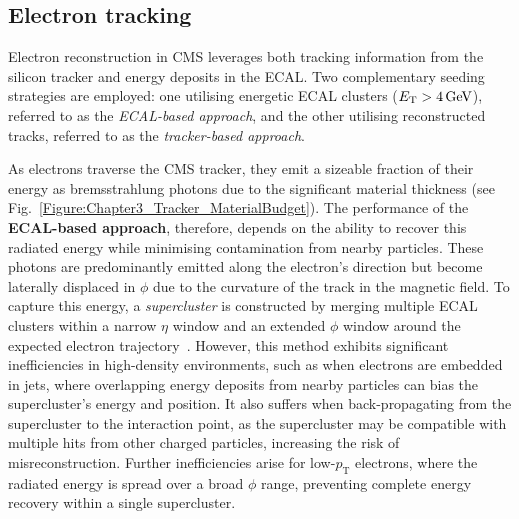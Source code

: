 \subsection{Electron tracking}
\label{Section:Chapter4_ElectronTracking}
Electron reconstruction in \ac{CMS} leverages both tracking information from the silicon tracker and energy deposits in the \ac{ECAL}. Two complementary seeding strategies are employed: one utilising energetic \ac{ECAL} clusters ($E_\mathrm{T} > 4\,\text{Ge\hspace{-.08em}V}$), referred to as the \textit{\ac{ECAL}-based approach}, and the other utilising reconstructed tracks, referred to as the \textit{tracker-based approach}.

As electrons traverse the \ac{CMS} tracker, they emit a sizeable fraction of their energy as bremsstrahlung photons due to the significant material thickness (see Fig.~\ref{Figure:Chapter3_Tracker_MaterialBudget}). The performance of the \textbf{\ac{ECAL}-based approach}, therefore, depends on the ability to recover this radiated energy while minimising contamination from nearby particles. These photons are predominantly emitted along the electron’s direction but become laterally displaced in $\phi$ due to the curvature of the track in the magnetic field. To capture this energy, a \textit{supercluster} is constructed by merging multiple ECAL clusters within a narrow $\eta$ window and an extended $\phi$ window around the expected electron trajectory~\cite{ParticleFlow}. However, this method exhibits significant inefficiencies in high-density environments, such as when electrons are embedded in jets, where overlapping energy deposits from nearby particles can bias the supercluster’s energy and position. It also suffers when back-propagating from the supercluster to the interaction point, as the supercluster may be compatible with multiple hits from other charged particles, increasing the risk of misreconstruction. Further inefficiencies arise for low-$p_\mathrm{T}$ electrons, where the radiated energy is spread over a broad $\phi$ range, preventing complete energy recovery within a single supercluster.

